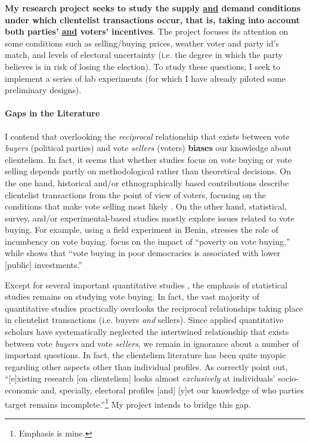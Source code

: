 \documentclass[onesided]{article}\usepackage[]{graphicx}\usepackage[]{color}
\begin{document}
{\bf My research project seeks to study the supply \underline{and} demand conditions under which clientelist transactions occur, that is, taking into account both parties' \underline{and} voters' incentives}. The project focuses its attention on some conditions such as selling/buying prices, weather voter and party id's match, and levels of electoral uncertainty (i.e. the degree in which the party believes is in risk of losing the election). To study these questions, I seek to implement a series of lab experiments (for which I have already piloted some preliminary designs).

%
\paragraph{Gaps in the Literature} I contend that overlooking the \emph{reciprocal} relationship that exists between vote \emph{buyers} (political parties) and vote \emph{sellers} (voters) {\bf biases} our knowledge about clientelism. In fact, it seems that whether studies focus on vote buying or vote selling depends partly on methodological rather than theoretical decisions. On the one hand, historical and/or ethnographically based contributions describe clientelist transactions from the point of view of voters, focusing on the conditions that make vote selling most likely \parencite{Posada-Carbo:1996aa,Sabato2001,Auyero2000,Szwarcberg2013,Borges2019}. On the other hand, statistical, survey, and/or experimental-based studies mostly explore issues related to vote buying. For example, using a field experiment in Benin, \textcite{Wantchekon2003} stresses the role of incumbency on vote buying. \textcite[227]{Jensen2013a} focus on the impact of ``poverty on vote buying,'' while \textcite[84]{Khemani2015} shows that ``vote buying in poor democracies is associated with lower [public] investments.'' 

Except for several important quantitative studies \parencite{Corstange2012a,Imai2014a,Nichter2014a,Hicken2015,Hicken2018,Auerbach2018,Bahamonde2020a}, the emphasis of statistical studies remains on studying vote buying. In fact, the vast majority of quantitative studies practically overlooks the reciprocal relationships taking place in clientelist transactions (i.e. buyers \emph{and} sellers). Since applied quantitative scholars have systematically neglected the intertwined relationship that exists between vote \emph{buyers} and vote \emph{sellers}, we remain in ignorance about a number of important questions. In fact, the clientelism literature has been quite myopic regarding other aspects other than individual profiles. As \textcite[14]{Carlin2015} correctly point out, ``[e]xisting research [on clientelism] looks almost \emph{exclusively} at individuals' socio-economic and, specially, electoral profiles [and] [y]et our knowledge of who parties target remains incomplete.''\footnote{Emphasis is mine.} My project intends to bridge this gap. 
\end{document}
